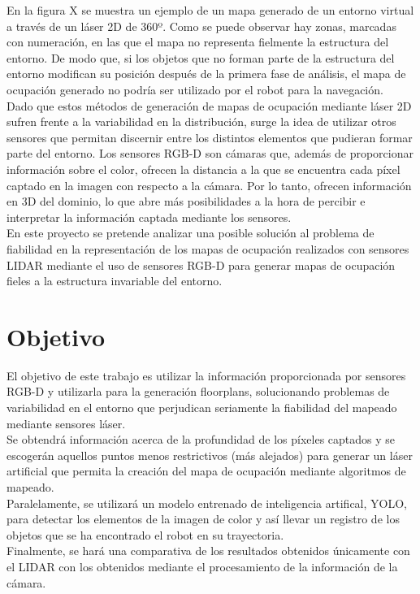 
En la figura X se muestra un ejemplo de un mapa generado de un entorno virtual a través de un láser 2D de 360º. Como se puede observar hay zonas, marcadas con numeración, en las que el mapa no representa fielmente la estructura del entorno. De modo que, si los objetos que no forman parte de la estructura del entorno modifican su posición después de la primera fase de análisis, el mapa de ocupación generado no podría ser utilizado por el robot para la navegación. \\

Dado que estos métodos de generación de mapas de ocupación mediante láser 2D sufren frente a la variabilidad en la distribución, surge la idea de utilizar otros sensores que permitan discernir entre los distintos elementos que pudieran formar parte del entorno. Los sensores RGB-D son cámaras que, además de proporcionar información sobre el color, ofrecen la distancia a la que se encuentra cada píxel captado en la imagen con respecto a la cámara. Por lo tanto, ofrecen información en 3D del dominio, lo que abre más posibilidades a la hora de percibir e interpretar la información captada mediante los sensores.\\

En este proyecto se pretende analizar una posible solución al problema de fiabilidad en la representación de los mapas de ocupación realizados con sensores LIDAR mediante el uso de sensores RGB-D para generar mapas de ocupación fieles a la estructura invariable del entorno.\\

\section{Objetivo}

El objetivo de este trabajo es utilizar la información proporcionada por sensores RGB-D y utilizarla para la generación floorplans, solucionando problemas de variabilidad en el entorno que perjudican seriamente la fiabilidad  del mapeado mediante sensores láser.\\

Se obtendrá información acerca de la profundidad de los píxeles captados y se escogerán aquellos puntos menos restrictivos (más alejados) para generar un láser artificial que permita la creación del mapa de ocupación mediante algoritmos de mapeado.\\

Paralelamente, se utilizará un modelo entrenado de inteligencia artifical, YOLO, para detectar los elementos de la imagen de color y así llevar un registro de los objetos que se ha encontrado el robot en su trayectoria.\\

Finalmente, se hará una comparativa de los resultados obtenidos únicamente con el LIDAR con los obtenidos mediante el procesamiento de la información de la cámara.\\